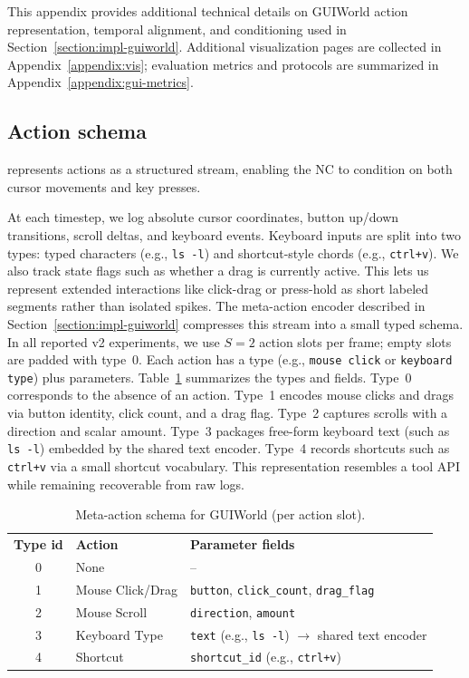\noindent This appendix provides additional technical details on GUIWorld action representation, temporal alignment, and conditioning used in Section~\ref{section:impl-guiworld}.
Additional visualization pages are collected in Appendix~\ref{appendix:vis}; evaluation metrics and protocols are summarized in Appendix~\ref{appendix:gui-metrics}.

\subsection{Action schema}
\ncguiworld{} represents actions as a structured stream, enabling the NC to condition on both cursor movements and key presses.

At each timestep, we log absolute cursor coordinates, button up/down transitions, scroll deltas, and keyboard events.
Keyboard inputs are split into two types: typed characters (e.g., \texttt{ls -l}) and shortcut-style chords (e.g., \texttt{ctrl+v}).
We also track state flags such as whether a drag is currently active.
This lets us represent extended interactions like click-drag or press-hold as short labeled segments rather than isolated spikes.
The meta-action encoder described in Section~\ref{section:impl-guiworld} compresses this stream into a small typed schema.
In all reported v2 experiments, we use $S{=}2$ action slots per frame; empty slots are padded with type~0.
Each action has a type (e.g., \texttt{mouse click} or \texttt{keyboard type}) plus parameters.
Table~\ref{tab:meta-action-schema} summarizes the types and fields.
Type~0 corresponds to the absence of an action.
Type~1 encodes mouse clicks and drags via button identity, click count, and a drag flag.
Type~2 captures scrolls with a direction and scalar amount.
Type~3 packages free-form keyboard text (such as \texttt{ls -l}) embedded by the shared text encoder.
Type~4 records shortcuts such as \texttt{ctrl+v} via a small shortcut vocabulary.
This representation resembles a tool API while remaining recoverable from raw logs.

\begin{table}[h]
  \centering
  \small
  \setlength{\tabcolsep}{6pt}
  \renewcommand{\arraystretch}{1.05}
  \caption{Meta-action schema for GUIWorld (per action slot).}
  \label{tab:meta-action-schema}
  \begin{tabularx}{\linewidth}{@{}c l >{\raggedright\arraybackslash}X@{}}
    \toprule
    \rowcolor{tablewarmhead}\textbf{Type id} & \textbf{Action} & \textbf{Parameter fields} \\
    0 & None & -- \\
    1 & Mouse Click/Drag & \texttt{button}, \texttt{click\_count}, \texttt{drag\_flag} \\
    2 & Mouse Scroll & \texttt{direction}, \texttt{amount} \\
    3 & Keyboard Type & \texttt{text} (e.g., \texttt{ls -l}) $\rightarrow$ shared text encoder \\
    4 & Shortcut & \texttt{shortcut\_id} (e.g., \texttt{ctrl+v}) \\
    \bottomrule
  \end{tabularx}
\end{table}

